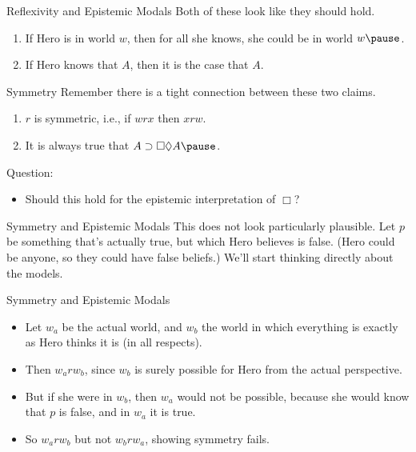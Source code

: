 \documentclass[
  14pt,
  letterpaper,
  ignorenonframetext,
  handout]{beamer}
\providecommand{\tightlist}{%
  \setlength{\itemsep}{0pt}\setlength{\parskip}{0pt}}\usepackage{longtable,booktabs,array}
\begin{document}
\begin{frame}{Reflexivity and Epistemic Modals}
\protect\hypertarget{reflexivity-and-epistemic-modals}{}
Both of these look like they should hold.

\begin{enumerate}
\tightlist
\item
  If Hero is in world \(w\), then for all she knows, she could be in
  world \(w \pause\).
\item
  If Hero knows that \(A\), then it is the case that \(A\).
\end{enumerate}
\end{frame}

\begin{frame}{Symmetry}
\protect\hypertarget{symmetry}{}
Remember there is a tight connection between these two claims.

\begin{enumerate}
\tightlist
\item
  \(r\) is symmetric, i.e., if \(wrx\) then \(xrw\).
\item
  It is always true that \(A \supset \Box \Diamond A \pause\).
\end{enumerate}

Question:

\begin{itemize}
\tightlist
\item
  Should this hold for the epistemic interpretation of \(\Box\)?
\end{itemize}
\end{frame}

\begin{frame}{Symmetry and Epistemic Modals}
\protect\hypertarget{symmetry-and-epistemic-modals}{}
This does not look particularly plausible. Let \(p\) be something that's
actually true, but which Hero believes is false. (Hero could be anyone,
so they could have false beliefs.) We'll start thinking directly about
the models.
\end{frame}

\begin{frame}{Symmetry and Epistemic Modals}
\protect\hypertarget{symmetry-and-epistemic-modals-1}{}
\begin{itemize}
\tightlist
\item
  Let \(w_a\) be the actual world, and \(w_b\) the world in which
  everything is exactly as Hero thinks it is (in all respects).
\item
  Then \(w_arw_b\), since \(w_b\) is surely possible for Hero from the
  actual perspective.
\item
  But if she were in \(w_b\), then \(w_a\) would not be possible,
  because she would know that \(p\) is false, and in \(w_a\) it is true.
\item
  So \(w_arw_b\) but not \(w_brw_a\), showing symmetry fails.
\end{itemize}
\end{frame}
\end{document}
